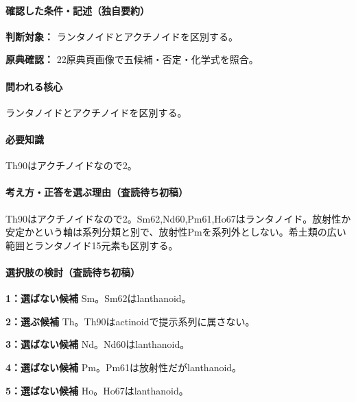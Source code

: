 \paragraph{確認した条件・記述（独自要約）}\mbox{}\par

\noindent\textbf{判断対象：} ランタノイドとアクチノイドを区別する。\par

\noindent\textbf{原典確認：} 22原典頁画像で五候補・否定・化学式を照合。\par

\paragraph{問われる核心} ランタノイドとアクチノイドを区別する。

\paragraph{必要知識} Th90はアクチノイドなので2。

\paragraph{考え方・正答を選ぶ理由（査読待ち初稿）} Th90はアクチノイドなので2。Sm62,Nd60,Pm61,Ho67はランタノイド。放射性か安定かという軸は系列分類と別で、放射性Pmを系列外としない。希土類の広い範囲とランタノイド15元素も区別する。

\paragraph{選択肢の検討（査読待ち初稿）}\mbox{}\par

\noindent\textbf{1：選ばない候補} Sm。Sm62はlanthanoid。\par

\noindent\textbf{2：選ぶ候補} Th。Th90はactinoidで提示系列に属さない。\par

\noindent\textbf{3：選ばない候補} Nd。Nd60はlanthanoid。\par

\noindent\textbf{4：選ばない候補} Pm。Pm61は放射性だがlanthanoid。\par

\noindent\textbf{5：選ばない候補} Ho。Ho67はlanthanoid。\par

